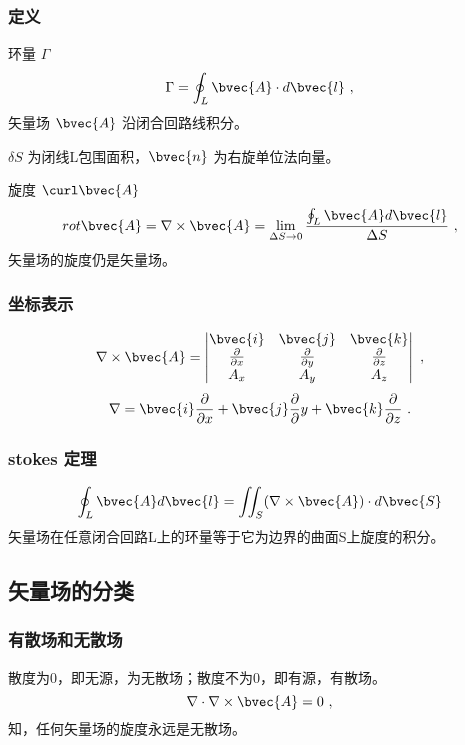 \subsubsection{定义}
环量 $\Gamma$
\begin{equation}\label{eq_VecAnl_10}
\Gamma=\oint_L \bvec{A} \cdot d \bvec{l}~,
\end{equation}
矢量场 $\bvec{A}$ 沿闭合回路线积分。

$\delta S$ 为闭线L包围面积，$\bvec{n}$ 为右旋单位法向量。

旋度 $\curl\bvec{A}$
\begin{equation}\label{eq_VecAnl_11}
rot \bvec{A}=\nabla \times \bvec{A}=\lim_{\Delta S \to 0} \frac{\oint_L \bvec{A} d\bvec{l}}{\Delta S}~,
\end{equation}
矢量场的旋度仍是矢量场。

\subsubsection{坐标表示}
\begin{equation}\label{eq_VecAnl_12}
\nabla \times \bvec{A}=
\begin{vmatrix}
\bvec{i} & \bvec{j} & \bvec{k} \\
\frac{\partial}{\partial x} & \frac{\partial}{\partial y} & \frac{\partial}{\partial z}\\
A_x & A_y & A_z
\end{vmatrix}~,
\end{equation}
\begin{equation}\label{eq_VecAnl_13}
\nabla = \bvec{i}\frac{\partial}{\partial x}+ \bvec{j} \frac{\partial}{\partial}y + \bvec{k} \frac{\partial}{\partial z}~.
\end{equation}

\subsubsection{stokes 定理}
\begin{equation}\label{eq_VecAnl_14}
\oint_L \bvec{A} d\bvec{l}=\iint_S (\nabla \times \bvec{A})\cdot d\bvec{S}
\end{equation}
矢量场在任意闭合回路L上的环量等于它为边界的曲面S上旋度的积分。

\subsection{矢量场的分类}
\subsubsection{有散场和无散场}
散度为0，即无源，为无散场；散度不为0，即有源，有散场。
\begin{equation}\label{eq_VecAnl_24}
\nabla\cdot\nabla\times\bvec{A}=0~,
\end{equation}
知，任何矢量场的旋度永远是无散场。

